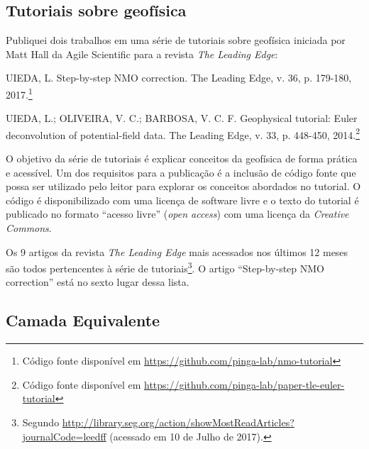 \documentclass[12pt,a4paper,oneside,titlepage,onecolumn]{article}
\begin{document}
\subsection{Tutoriais sobre geofísica}

Publiquei dois trabalhos em uma série de tutoriais sobre geofísica iniciada por
Matt Hall da Agile Scientific \citep{hall_user_2016} para a revista \textit{The
Leading Edge}:

\begin{displayquote}
    UIEDA, L. Step-by-step NMO correction. The Leading Edge, v. 36, p.
    179-180, 2017.\footnote{Código fonte disponível em
    \url{https://github.com/pinga-lab/nmo-tutorial}}
\end{displayquote}

\begin{displayquote}
    UIEDA, L.; OLIVEIRA, V. C.; BARBOSA, V. C. F. Geophysical tutorial: Euler
    deconvolution of potential-field data. The Leading Edge, v. 33, p. 448-450,
    2014.\footnote{Código fonte disponível em
    \url{https://github.com/pinga-lab/paper-tle-euler-tutorial}}
\end{displayquote}

O objetivo da série de tutoriais é explicar conceitos da geofísica de forma
prática e acessível.
Um dos requisitos para a publicação é a inclusão de código fonte que possa ser
utilizado pelo leitor para explorar os conceitos abordados no tutorial.
O código é disponibilizado com uma licença de software livre
e o texto do tutorial é publicado no formato ``acesso livre'' (\textit{open
access}) com uma licença da \textit{Creative Commons}.

Os 9 artigos da revista \textit{The Leading Edge} mais acessados nos últimos 12
meses são todos pertencentes à série de tutoriais\footnote{Segundo
\url{http://library.seg.org/action/showMostReadArticles?journalCode=leedff}
(acessado em 10 de Julho de 2017).}.
O artigo ``Step-by-step NMO correction'' está no sexto lugar dessa lista.



\subsection{Camada Equivalente}
\end{document}

